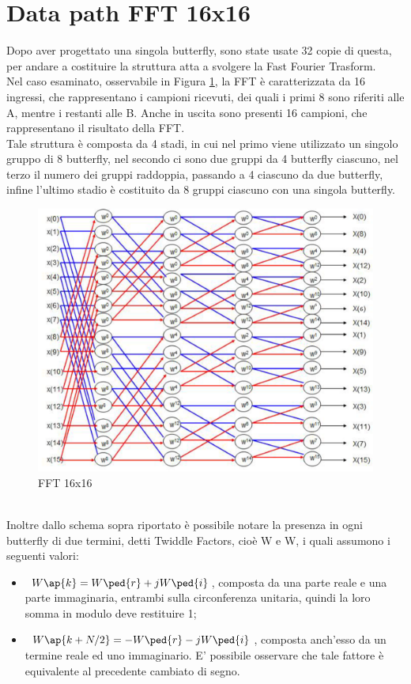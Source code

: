 \documentclass[a4paper, titlepage]{article}
\begin{document}
\section{Data path FFT 16x16}%
Dopo aver progettato una singola butterfly, sono state usate 32 copie di questa, per andare a costituire la struttura atta a svolgere la Fast Fourier Trasform.\\Nel caso esaminato, osservabile in Figura \ref{fig: schema FFT}, la FFT è caratterizzata da 16 ingressi, che rappresentano i campioni ricevuti, dei quali i primi 8 sono riferiti alle A, mentre i restanti alle B. Anche in uscita sono presenti 16 campioni, che rappresentano il risultato della FFT.%
\\Tale struttura è composta da 4 stadi, in cui nel primo viene utilizzato un singolo gruppo di 8 butterfly, nel secondo ci sono due gruppi da 4 butterfly ciascuno, nel terzo il numero dei gruppi raddoppia, passando a 4 ciascuno da due butterfly, infine l'ultimo stadio è costituito da 8 gruppi ciascuno con una singola butterfly.
\begin{figure}[h]
    \centering
    \includegraphics[scale=0.6]{FFT_scheme.png}
    \caption{FFT 16x16}
    \label{fig: schema FFT}
\end{figure}\\
Inoltre dallo schema sopra riportato è possibile notare la presenza in ogni butterfly di due termini, detti Twiddle Factors, cioè W e W, i quali assumono i seguenti valori:
\begin{itemize}
    \item $\ W\ap{k}=W\ped{r}+jW\ped{i}$, composta da una parte reale e una parte immaginaria, entrambi sulla circonferenza unitaria, quindi la loro somma in modulo deve restituire 1;
    \item $\ W\ap{k+N/2}=-W\ped{r}-jW\ped{i}$, composta anch'esso da un termine reale ed uno immaginario. E' possibile osservare che tale fattore è equivalente al precedente cambiato di segno.
\end{itemize}
\end{document}
